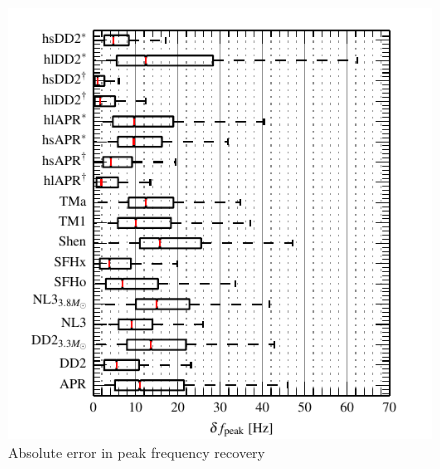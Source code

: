 \documentclass[serif,mathserif,10pt]{beamer}
\begin{document}
\begin{frame}
\begin{columns}[]
        \begin{center}
            \vspace{-0.5cm}
            \begin{figure}
                \includegraphics[width=1\columnwidth]{figures/deltaFpeak.pdf}
                \caption{Absolute error in peak frequency recovery}
            \end{figure}
        \end{center}

    \end{columns}

\end{frame}
\end{document}
